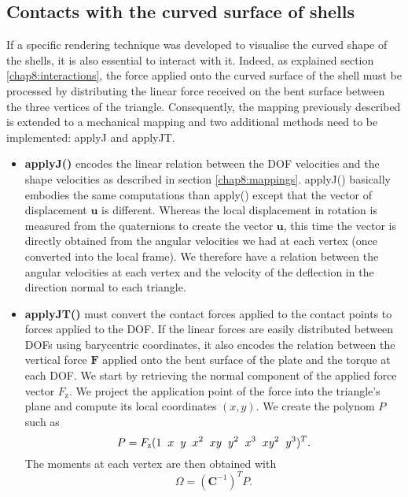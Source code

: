 	\subsection{Contacts with the curved surface of shells}
If a specific rendering technique was developed to visualise the curved shape of the shells, it is also essential to interact with it. Indeed, as explained section \ref{chap8:interactions}, the force applied onto the curved surface of the shell must be processed by distributing the linear force received on the bent surface between the three vertices of the triangle. Consequently, the mapping previously described is extended to a mechanical mapping and two additional methods need to be implemented: applyJ and applyJT. 
%
\begin{itemize}
\item \textbf{applyJ()} encodes the linear relation between the DOF velocities and the shape velocities as described in section \ref{chap8:mappings}. applyJ() basically embodies the same computations than apply() except that the vector of displacement $\mathbf{u}$ is different. Whereas the local displacement in rotation is measured from the quaternions to create the vector $\mathbf{u}$, this time the vector is directly obtained from the angular velocities we had at each vertex (once converted into the local frame). We therefore have a relation between the angular velocities at each vertex and the velocity of the deflection in the direction normal to each triangle. 
\item \textbf{applyJT()} must convert the contact forces applied to the contact points to forces applied to the DOF. If the linear forces are easily distributed between DOFs using barycentric coordinates, it also encodes the relation between the vertical force $ \mathbf{F} $ applied onto the bent surface of the plate and the torque at each DOF. We start by retrieving the normal component of the applied force vector $F_{\mathrm{z}}$. We project the application point of the force into the triangle's plane and compute its local coordinates $(x,y)$. We create the polynom $P$ such as 
%
\begin{equation}
P = F_{\mathrm{z}}(1 \hspace{0.2cm} x \hspace{0.2cm} y \hspace{0.2cm} x^2 \hspace{0.2cm} xy \hspace{0.2cm} y^2 \hspace{0.2cm} x^3 \hspace{0.2cm} xy^2 \hspace{0.2cm} y^3)^T. 
\end{equation}
%
The moments at each vertex are then obtained with 
\begin{equation}
\Omega = (\textbf{C}^{-1})^T P.
\end{equation}
\end{itemize}


